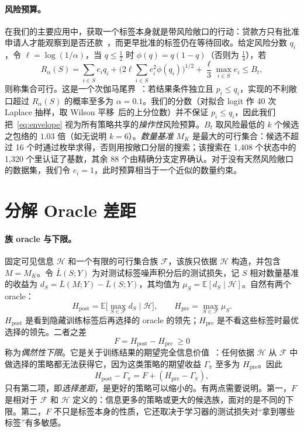 \documentclass[runningheads]{llncs}
\newcommand{\Hpost}{H_{\mathrm{post}}}
\newcommand{\Hpre}{H_{\mathrm{pre}}}
\begin{document}
\paragraph{风险预算。}在我们的主要应用中，获取一个标签本身就是带风险敞口的行动：贷款方只有批准申请人才能观察到是否还款~\cite{lakkaraju2017selective,wei2021selective}，而更早批准的标签仍在等待回收。给定风险分数 $q_i$，令 $\ell=\log(1/\alpha)$，当 $q\le\frac12$ 时 $\phi(q)=q(1-q)$（否则为 $\frac14$），若
\begin{equation}
 R_\alpha(S)=\sum_{i\in S}e_iq_i+\Big(2\ell\sum_{i\in S}e_i^2\phi(q_i)\Big)^{1/2}+\frac{\ell}{3}\max_{i\in S}e_i\le B_t ,
 \label{eq:envelope}
\end{equation}
则称集合可行。这是一个次伽马尾界~\cite{boucheron2013concentration}：若结果条件独立且 $p_i\le q_i$，实现的不利敞口超过 $R_\alpha(S)$ 的概率至多为 $\alpha=0.1$。我们的分数（对拟合 logit 作 40 次 Laplace 抽样，取 Wilson 平移~\cite{wilson1927probable}后的上分位数）并不保证 $p_i\le q_i$，因此我们把~\eqref{eq:envelope} 视为所有策略共享的\emph{操作性}风险预算。$B_t$ 取风险最低的 $k$ 个候选之包络的 $1.03$ 倍（如无说明 $k=6$）。\emph{数量基准} $M_K$ 是最大的可行集合：候选不超过 16 个时通过枚举求得，否则用按敞口分层的搜索；该搜索在 1{,}408 个状态中的 1{,}320 个里认证了基数，其余 88 个由精确分支定界确认。对于没有天然风险敞口的数据集，我们令 $e_i=1$，此时预算相当于一个近似的数量约束。

\section{分解 Oracle 差距}
\label{sec:protocol}
\paragraph{族 oracle 与下限。}固定可见信息 $\mathcal H$ 和一个有限的可行集合族 $\mathcal F$，该族只依据 $\mathcal H$ 构造，并包含 $M=M_K$。令 $\bar L(S;Y)$ 为对测试标签噪声积分后的测试损失，记 $S$ 相对数量基准的收益为 $d_S=\bar L(M;Y)-\bar L(S;Y)$，其均值为 $\mu_S=\mathbb E[d_S\mid\mathcal H]$。自然有两个 oracle：
\begin{equation}
 \Hpost=\mathbb E\big[\max_{S\in\mathcal F}d_S\mid\mathcal H\big],\qquad
 \Hpre=\max_{S\in\mathcal F}\mu_S .
\end{equation}
$\Hpost$ 是看到隐藏训练标签后再选择的 oracle 的领先；$\Hpre$ 是不看这些标签时最优选择的领先。二者之差
\begin{equation}
 F=\Hpost-\Hpre\ \ge 0
\end{equation}
称为\emph{偶然性下限}。它是关于训练结果的期望完全信息价值~\cite{howard1966information,raiffa1961applied}：任何依据 $\mathcal H$ 从 $\mathcal F$ 中做选择的策略都无法获得它，因为这类策略的期望收益 $\Gamma_\pi$ 至多为 $\Hpre$。因此
\begin{equation}
 \Hpost-\Gamma_\pi = F+(\Hpre-\Gamma_\pi),
\end{equation}
只有第二项，即\emph{选择差距}，是更好的策略可以缩小的。有两点需要说明。第一，$F$ 是相对于 $\mathcal F$ 和 $\mathcal H$ 定义的：信息更多的策略或更大的候选族，面对的是不同的下限。第二，$F$ 不只是标签本身的性质，它还取决于学习器的测试损失对“拿到哪些标签”有多敏感。
\end{document}
